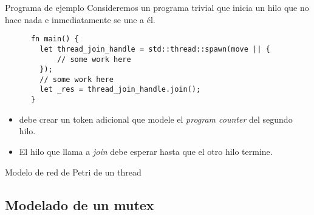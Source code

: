 \documentclass{beamer}
\begin{document}
\begin{frame}[fragile]{Programa de ejemplo}
  Consideremos un programa trivial que inicia un hilo que no hace nada
  e inmediatamente se une a él.

  \vfill

  \begin{listing}
    \begin{verbatim}
      fn main() {
        let thread_join_handle = std::thread::spawn(move || {
            // some work here
        });
        // some work here
        let _res = thread_join_handle.join();
      }   
    \end{verbatim}
  \end{listing}

  \vfill

  \begin{itemize}
    \item {} debe crear un token adicional
          que modele el \emph{program counter} del segundo hilo.
    \item El hilo que llama a \emph{join} debe esperar hasta que el otro hilo termine.
  \end{itemize}
\end{frame}

\begin{frame}{Modelo de red de Petri de un thread}
  \begin{figure}
    \centering
    
  \end{figure}
\end{frame}

\subsection{Modelado de un mutex}
\end{document}
